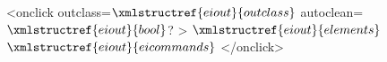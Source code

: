 <onclick outclass=$\xmlstructref{eiout}{outclass}$ autoclean=$\xmlstructref{eiout}{bool}$? >
  $\xmlstructref{eiout}{elements}$
  $\xmlstructref{eiout}{eicommands}$
</onclick>
